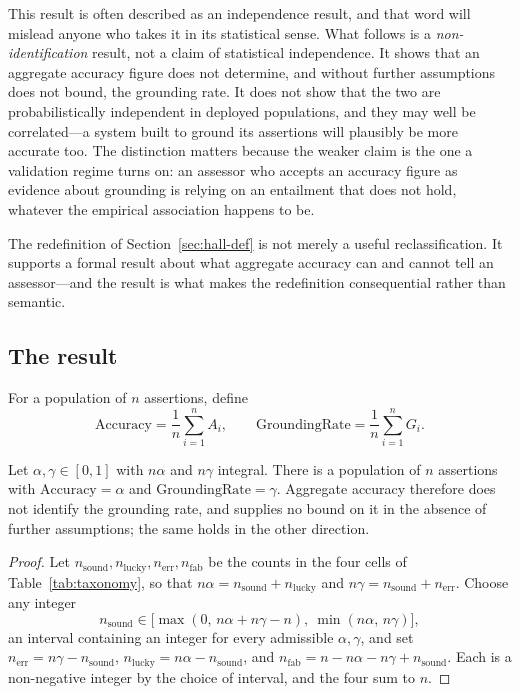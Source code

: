 This result is often described as an independence result, and that word will mislead
anyone who takes it in its statistical sense. What follows is a
\emph{non-identification} result, not a claim of statistical independence. It shows that an aggregate accuracy figure does not determine,
and without further assumptions does not bound, the grounding rate. It does not show that
the two are probabilistically independent in deployed populations, and they may well be
correlated---a system built to ground its assertions will plausibly be more accurate too.
The distinction matters because the weaker claim is the one a validation regime turns on:
an assessor who accepts an accuracy figure as evidence about grounding is relying on an
entailment that does not hold, whatever the empirical association happens to be.

The redefinition of Section~\ref{sec:hall-def} is not merely a useful
reclassification. It supports a formal result about what aggregate accuracy can and
cannot tell an assessor---and the result is what makes the redefinition consequential
rather than semantic.

\subsection{The result}

For a population of $n$ assertions, define
\begin{equation}
  \mathrm{Accuracy} = \frac{1}{n}\sum_{i=1}^{n} A_i,
  \qquad
  \mathrm{GroundingRate} = \frac{1}{n}\sum_{i=1}^{n} G_i.
  \label{eq:rates}
\end{equation}

\begin{proposition}
\label{prop:independence}
Let $\alpha, \gamma \in [0,1]$ with $n\alpha$ and $n\gamma$ integral. There is a
population of $n$ assertions with $\mathrm{Accuracy} = \alpha$ and
$\mathrm{GroundingRate} = \gamma$. Aggregate accuracy therefore does not identify the
grounding rate, and supplies no bound on it in the absence of further assumptions; the
same holds in the other direction.
\end{proposition}

\begin{proof}
Let $n_{\mathrm{sound}}, n_{\mathrm{lucky}}, n_{\mathrm{err}}, n_{\mathrm{fab}}$
be the counts in the four cells of Table~\ref{tab:taxonomy}, so that
$n\alpha = n_{\mathrm{sound}} + n_{\mathrm{lucky}}$ and
$n\gamma = n_{\mathrm{sound}} + n_{\mathrm{err}}$. Choose any integer
\[
  n_{\mathrm{sound}} \in
  \bigl[\max(0,\, n\alpha + n\gamma - n),\ \min(n\alpha,\, n\gamma)\bigr],
\]
an interval containing an integer for every admissible $\alpha, \gamma$, and set
$n_{\mathrm{err}} = n\gamma - n_{\mathrm{sound}}$,
$n_{\mathrm{lucky}} = n\alpha - n_{\mathrm{sound}}$, and
$n_{\mathrm{fab}} = n - n\alpha - n\gamma + n_{\mathrm{sound}}$. Each is a
non-negative integer by the choice of interval, and the four sum to $n$.
\end{proof}

